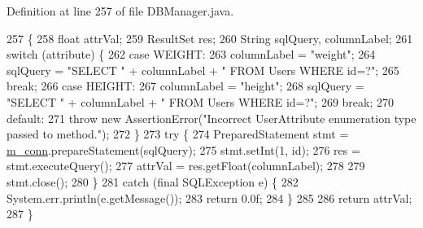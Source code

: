 Definition at line 257 of file D\+B\+Manager.\+java.


\begin{DoxyCode}
257                                                                                     \{
258         \textcolor{keywordtype}{float} attrVal;
259         ResultSet res;
260         String sqlQuery, columnLabel;
261         \textcolor{keywordflow}{switch} (attribute) \{
262             \textcolor{keywordflow}{case} WEIGHT:
263                 columnLabel = \textcolor{stringliteral}{"weight"};
264                 sqlQuery = \textcolor{stringliteral}{"SELECT "} + columnLabel + \textcolor{stringliteral}{" FROM Users WHERE id=?"};
265                 \textcolor{keywordflow}{break};
266             \textcolor{keywordflow}{case} HEIGHT:
267                 columnLabel = \textcolor{stringliteral}{"height"};
268                 sqlQuery = \textcolor{stringliteral}{"SELECT "} + columnLabel + \textcolor{stringliteral}{" FROM Users WHERE id=?"};
269                 \textcolor{keywordflow}{break};
270             \textcolor{keywordflow}{default}:
271                 \textcolor{keywordflow}{throw} \textcolor{keyword}{new} AssertionError(\textcolor{stringliteral}{"Incorrect UserAttribute enumeration type passed to method."});
272         \}
273         \textcolor{keywordflow}{try} \{
274             PreparedStatement stmt = \hyperlink{classcom_1_1activitytracker_1_1_d_b_manager_a064088d13ac09eb147fdc19268771521}{m\_conn}.prepareStatement(sqlQuery);
275             stmt.setInt(1, \textcolor{keywordtype}{id});
276             res = stmt.executeQuery();
277             attrVal = res.getFloat(columnLabel);
278 
279             stmt.close();
280         \}
281         \textcolor{keywordflow}{catch} (\textcolor{keyword}{final} SQLException e) \{
282             System.err.println(e.getMessage());
283             \textcolor{keywordflow}{return} 0.0f;
284         \}
285 
286         \textcolor{keywordflow}{return} attrVal;
287     \}
\end{DoxyCode}
